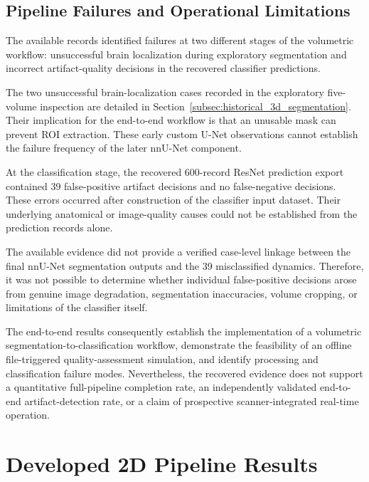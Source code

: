 \subsection{Pipeline Failures and Operational Limitations}
\label{subsec:results_3d_pipeline_failures}

The available records identified failures at two different stages of the volumetric workflow: unsuccessful brain localization during exploratory segmentation and incorrect artifact-quality decisions in the recovered classifier predictions.

The two unsuccessful brain-localization cases recorded in the exploratory five-volume inspection are detailed in Section~\ref{subsec:historical_3d_segmentation}. Their implication for the end-to-end workflow is that an unusable mask can prevent ROI extraction. These early custom U-Net observations cannot establish the failure frequency of the later nnU-Net component.

At the classification stage, the recovered 600-record ResNet prediction export contained 39 false-positive artifact decisions and no false-negative decisions. These errors occurred after construction of the classifier input dataset. Their underlying anatomical or image-quality causes could not be established from the prediction records alone.

The available evidence did not provide a verified case-level linkage between the final nnU-Net segmentation outputs and the 39 misclassified dynamics. Therefore, it was not possible to determine whether individual false-positive decisions arose from genuine image degradation, segmentation inaccuracies, volume cropping, or limitations of the classifier itself.

The end-to-end results consequently establish the implementation of a volumetric segmentation-to-classification workflow, demonstrate the feasibility of an offline file-triggered quality-assessment simulation, and identify processing and classification failure modes. Nevertheless, the recovered evidence does not support a quantitative full-pipeline completion rate, an independently validated end-to-end artifact-detection rate, or a claim of prospective scanner-integrated real-time operation.

\section{Developed 2D Pipeline Results}
\label{sec:results_2d_segmentation}

